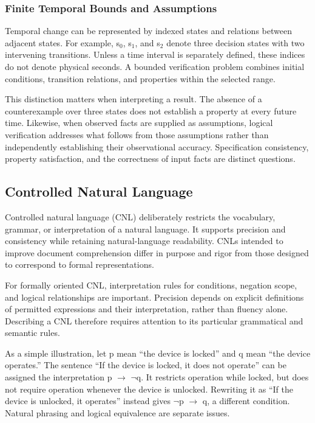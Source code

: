 \documentclass[nolineno]{ieeeaccess}
\begin{document}
\subsubsection{Finite Temporal Bounds and Assumptions}

Temporal change can be represented by indexed states and relations between adjacent states. For example, s\ensuremath{_0}, s\ensuremath{_1}, and s\ensuremath{_2} denote three decision states with two intervening transitions. Unless a time interval is separately defined, these indices do not denote physical seconds. A bounded verification problem combines initial conditions, transition relations, and properties within the selected range.\par

This distinction matters when interpreting a result. The absence of a counterexample over three states does not establish a property at every future time. Likewise, when observed facts are supplied as assumptions, logical verification addresses what follows from those assumptions rather than independently establishing their observational accuracy. Specification consistency, property satisfaction, and the correctness of input facts are distinct questions.\par

\subsection{Controlled Natural Language}

Controlled natural language (CNL) deliberately restricts the vocabulary, grammar, or interpretation of a natural language. It supports precision and consistency while retaining natural-language readability. CNLs intended to improve document comprehension differ in purpose and rigor from those designed to correspond to formal representations. \cite{r13}\par

For formally oriented CNL, interpretation rules for conditions, negation scope, and logical relationships are important. Precision depends on explicit definitions of permitted expressions and their interpretation, rather than fluency alone. Describing a CNL therefore requires attention to its particular grammatical and semantic rules. \cite{r13}\par

As a simple illustration, let p mean “the device is locked” and q mean “the device operates.” The sentence “If the device is locked, it does not operate” can be assigned the interpretation p \ensuremath{\rightarrow} \ensuremath{\neg}q. It restricts operation while locked, but does not require operation whenever the device is unlocked. Rewriting it as “If the device is unlocked, it operates” instead gives \ensuremath{\neg}p \ensuremath{\rightarrow} q, a different condition. Natural phrasing and logical equivalence are separate issues.\par
\end{document}
